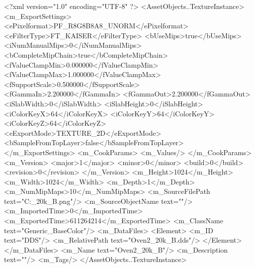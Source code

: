 <?xml version="1.0" encoding="UTF-8" ?>
<AssetObjects..TextureInstance>
	<m_ExportSettings>
		<ePixelformat>PF_R8G8B8A8_UNORM</ePixelformat>
		<eFilterType>FT_KAISER</eFilterType>
		<bUseMips>true</bUseMips>
		<iNumManualMips>0</iNumManualMips>
		<bCompleteMipChain>true</bCompleteMipChain>
		<fValueClampMin>0.000000</fValueClampMin>
		<fValueClampMax>1.000000</fValueClampMax>
		<fSupportScale>0.500000</fSupportScale>
		<fGammaIn>2.200000</fGammaIn>
		<fGammaOut>2.200000</fGammaOut>
		<iSlabWidth>0</iSlabWidth>
		<iSlabHeight>0</iSlabHeight>
		<iColorKeyX>64</iColorKeyX>
		<iColorKeyY>64</iColorKeyY>
		<iColorKeyZ>64</iColorKeyZ>
		<eExportMode>TEXTURE_2D</eExportMode>
		<bSampleFromTopLayer>false</bSampleFromTopLayer>
	</m_ExportSettings>
	<m_CookParams>
		<m_Values/>
	</m_CookParams>
	<m_Version>
		<major>1</major>
		<minor>0</minor>
		<build>0</build>
		<revision>0</revision>
	</m_Version>
	<m_Height>1024</m_Height>
	<m_Width>1024</m_Width>
	<m_Depth>1</m_Depth>
	<m_NumMipMaps>10</m_NumMipMaps>
	<m_SourceFilePath text="C:\Users\Shadow\Desktop\Prototypes{}_20k_B.png"/>
	<m_SourceObjectName text=""/>
	<m_ImportedTime>0</m_ImportedTime>
	<m_ExportedTime>611264214</m_ExportedTime>
	<m_ClassName text="Generic_BaseColor"/>
	<m_DataFiles>
		<Element>
			<m_ID text="DDS"/>
			<m_RelativePath text="Oven2_20k_B.dds"/>
		</Element>
	</m_DataFiles>
	<m_Name text="Oven2_20k_B"/>
	<m_Description text=""/>
	<m_Tags/>
</AssetObjects..TextureInstance>

